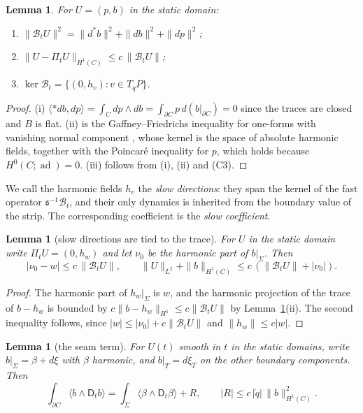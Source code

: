\documentclass[11pt]{amsart}
\newtheorem{lemma}[theorem]{Lemma}
\theoremstyle{definition}
\theoremstyle{remark}
\theoremstyle{plain}
\numberwithin{equation}{section}
\newcommand{\ad}{\operatorname{ad}}
\begin{document}
\begin{lemma}\label{lem:hodge}
For $U=(p,b)$ in the static domain:
\begin{enumerate}[label=(\roman*)]
\item $\|\mathcal B_tU\|^2=\|d^*b\|^2+\|db\|^2+\|dp\|^2$;
\item $\|U-\Pi_tU\|_{H^1(C)}\le c\,\|\mathcal B_tU\|$;
\item $\ker\mathcal B_t=\{(0,h_v):v\in T_qP\}$.
\end{enumerate}
\end{lemma}

\begin{proof}
(i) $\langle*db,dp\rangle=\int_Cdp\wedge db=\int_{\partial C}p\,d(b|_{\partial C})=0$
since the traces are closed and $B$ is flat. (ii) is the
Gaffney--Friedrichs inequality for one-forms with vanishing normal
component \cite[Corollary~2.1.6 and Theorem~2.1.7]{Schwarz}, whose kernel is the space of
absolute harmonic fields, together with the Poincar\'e inequality for
$p$, which holds because $H^0(C;\ad)=0$. (iii) follows from (i), (ii)
and (C3).
\end{proof}

We call the harmonic fields $h_v$ the \emph{slow directions}: they span the kernel
of the fast operator ${\mathfrak s}^{-1}\mathcal B_t$, and their only dynamics is
inherited from the boundary value of the strip. The corresponding coefficient
is the \emph{slow coefficient}.

\begin{lemma}[slow directions are tied to the trace]\label{lem:tie}
For $U$ in the static domain write $\Pi_tU=(0,h_w)$ and let $\nu_0$ be
the harmonic part of $b|_\Sigma$. Then
\[
|\nu_0-w|\le c\,\|\mathcal B_tU\|,\qquad
\|U\|_{L^2}+\|b\|_{H^1(C)}\le c\,(\|\mathcal B_tU\|+|\nu_0|).
\]
\end{lemma}

\begin{proof}
The harmonic part of $h_w|_\Sigma$ is $w$, and the harmonic projection
of the trace of $b-h_w$ is bounded by $c\|b-h_w\|_{H^1}\le
c\|\mathcal B_tU\|$ by Lemma~\ref{lem:hodge}(ii). The second
inequality follows, since $|w|\le|\nu_0|+c\|\mathcal B_tU\|$ and
$\|h_w\|\le c|w|$.
\end{proof}

\begin{lemma}[the seam term]\label{lem:seam}
For $U(t)$ smooth in $t$ in the static domains, write $b|_\Sigma=\beta
+d\xi$ with $\beta$ harmonic, and $b|_{T}=d\xi_T$ on the other boundary
components. Then
\[
\int_{\partial C}\langle b\wedge\mathsf D_tb\rangle
=\int_\Sigma\langle\beta\wedge\mathsf D_t\beta\rangle+R,\qquad
|R|\le c\,|\dot q|\,\|b\|^2_{H^1(C)} .
\]
\end{lemma}
\end{document}
